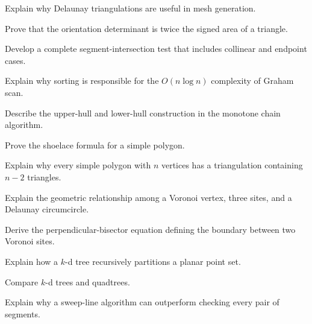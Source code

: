 \begin{exercise}[2]
Explain why Delaunay triangulations are useful in mesh generation.
\end{exercise}

\begin{exercise}[3]
Prove that the orientation determinant is twice the signed area of a
triangle.
\end{exercise}

\begin{exercise}[3]
Develop a complete segment-intersection test that includes collinear and
endpoint cases.
\end{exercise}

\begin{exercise}[3]
Explain why sorting is responsible for the \(O(n\log n)\) complexity of
Graham scan.
\end{exercise}

\begin{exercise}[3]
Describe the upper-hull and lower-hull construction in the monotone chain
algorithm.
\end{exercise}

\begin{exercise}[3]
Prove the shoelace formula for a simple polygon.
\end{exercise}

\begin{exercise}[3]
Explain why every simple polygon with \(n\) vertices has a triangulation
containing \(n-2\) triangles.
\end{exercise}

\begin{exercise}[3]
Explain the geometric relationship among a Voronoi vertex, three sites, and
a Delaunay circumcircle.
\end{exercise}

\begin{exercise}[3]
Derive the perpendicular-bisector equation defining the boundary between two
Voronoi sites.
\end{exercise}

\begin{exercise}[3]
Explain how a \(k\)-d tree recursively partitions a planar point set.
\end{exercise}

\begin{exercise}[3]
Compare \(k\)-d trees and quadtrees.
\end{exercise}

\begin{exercise}[3]
Explain why a sweep-line algorithm can outperform checking every pair of
segments.
\end{exercise}

